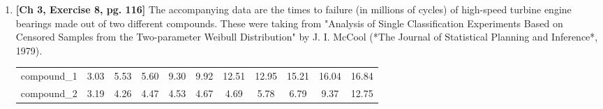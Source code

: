 \documentclass[11pt]{article}\usepackage[]{graphicx}\usepackage[]{color}
\begin{document}
\begin{enumerate}
\begin{enumerate}





\end{enumerate}

\item  \textbf{[Ch 3, Exercise 8, pg. 116]} The accompanying data are the times to failure (in millions of cycles) of high-speed turbine engine bearings made out of two different compounds. These were taking from "Analysis of Single Classification Experiments Based on Censored Samples from the Two-parameter Weibull Distribution" by J. I. McCool (*The Journal of Statistical Planning and Inference*, 1979).
    

\begin{center}
	\begin{tabular}{|ccccccccccc|}	
		\hline
		compound_1  & 3.03 & 5.53 & 5.60 & 9.30 & 9.92 & 12.51 & 12.95 & 15.21 & 16.04 & 16.84\\
		compound_2 & 3.19 & 4.26 & 4.47 & 4.53 & 4.67 & 4.69 & 5.78 & 6.79 & 9.37 & 12.75\\
		\hline
	\hline                 
	\end{tabular}
\end{center}


\end{enumerate}
\end{document}
